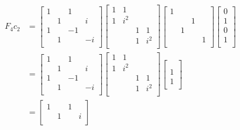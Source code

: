 \documentclass[a4paper]{article}
\begin{document}
\begin{align*}
	F_{4}c_{2} & = \begin{bmatrix}
		1 &  & 1 & \\
		 & 1 &  & i \\
		1 &  & -1 & \\
		 & 1 &  & -i \\
	\end{bmatrix} 
	\begin{bmatrix}
		1 & 1 &  & \\
		1 & i^{2} &  & \\
		 &  & 1 & 1\\
		 &  & 1 & i^{2} \\
	\end{bmatrix}
	\begin{bmatrix}
		1 &  &  & \\
		 &  & 1 & \\
		 & 1 &  & \\
		 &  &  & 1 \\
	\end{bmatrix}
	\begin{bmatrix}
		0 \\
		1 \\
		0 \\
		1 \\
	\end{bmatrix} \\
	 & = \begin{bmatrix}
		1 &  & 1 & \\
		 & 1 &  & i \\
		1 &  & -1 & \\
		 & 1 &  & -i \\
	\end{bmatrix} 
	\begin{bmatrix}
		1 & 1 &  & \\
		1 & i^{2} &  & \\
		 &  & 1 & 1\\
		 &  & 1 & i^{2} \\
	\end{bmatrix}
	\begin{bmatrix}
		\\
		\\
		1 \\
		1 \\
	\end{bmatrix} \\
	 & = \begin{bmatrix}
		1 &  & 1 & \\
		 & 1 &  & i \\

\end{bmatrix}
\end{align*}
\end{document}
